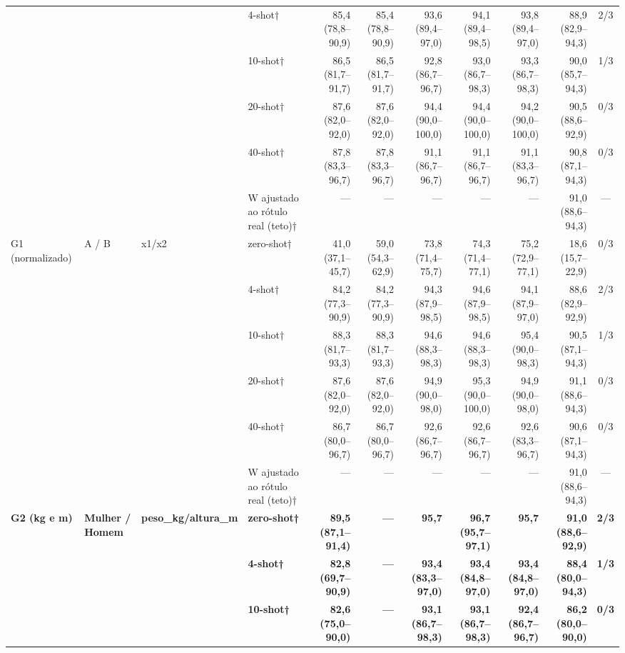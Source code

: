 \begin{table}[htbp]
\begin{tabular}{llllrrrrrrc}
 &  &  & 4-shot† & 85,4 (78,8–90,9) & 85,4 (78,8–90,9) & 93,6 (89,4–97,0) & 94,1 (89,4–98,5) & 93,8 (89,4–97,0) & 88,9 (82,9–94,3) & 2/3 \\
 &  &  & 10-shot† & 86,5 (81,7–91,7) & 86,5 (81,7–91,7) & 92,8 (86,7–96,7) & 93,0 (86,7–98,3) & 93,3 (86,7–98,3) & 90,0 (85,7–94,3) & 1/3 \\
 &  &  & 20-shot† & 87,6 (82,0–92,0) & 87,6 (82,0–92,0) & 94,4 (90,0–100,0) & 94,4 (90,0–100,0) & 94,2 (90,0–100,0) & 90,5 (88,6–92,9) & 0/3 \\
 &  &  & 40-shot† & 87,8 (83,3–96,7) & 87,8 (83,3–96,7) & 91,1 (86,7–96,7) & 91,1 (86,7–96,7) & 91,1 (83,3–96,7) & 90,8 (87,1–94,3) & 0/3 \\
 &  &  & W ajustado ao rótulo real (teto)† & — & — & — & — & — & 91,0 (88,6–94,3) & — \\
\midrule
G1 (normalizado) & A / B & x1/x2 & zero-shot† & 41,0 (37,1–45,7) & 59,0 (54,3–62,9) & 73,8 (71,4–75,7) & 74,3 (71,4–77,1) & 75,2 (72,9–77,1) & 18,6 (15,7–22,9) & 0/3 \\
 &  &  & 4-shot† & 84,2 (77,3–90,9) & 84,2 (77,3–90,9) & 94,3 (87,9–98,5) & 94,6 (87,9–98,5) & 94,1 (87,9–97,0) & 88,6 (82,9–92,9) & 2/3 \\
 &  &  & 10-shot† & 88,3 (81,7–93,3) & 88,3 (81,7–93,3) & 94,6 (88,3–98,3) & 94,6 (88,3–98,3) & 95,4 (90,0–98,3) & 90,5 (87,1–94,3) & 1/3 \\
 &  &  & 20-shot† & 87,6 (82,0–92,0) & 87,6 (82,0–92,0) & 94,9 (90,0–98,0) & 95,3 (90,0–100,0) & 94,9 (90,0–98,0) & 91,1 (88,6–94,3) & 0/3 \\
 &  &  & 40-shot† & 86,7 (80,0–96,7) & 86,7 (80,0–96,7) & 92,6 (86,7–96,7) & 92,6 (86,7–96,7) & 92,6 (83,3–96,7) & 90,6 (87,1–94,3) & 0/3 \\
 &  &  & W ajustado ao rótulo real (teto)† & — & — & — & — & — & 91,0 (88,6–94,3) & — \\
\midrule
\textbf{G2 (kg e m)} & \textbf{Mulher / Homem} & \textbf{peso\_kg/altura\_m} & \textbf{zero-shot†} & \textbf{89,5 (87,1–91,4)} & \textbf{—} & \textbf{95,7} & \textbf{96,7 (95,7–97,1)} & \textbf{95,7} & \textbf{91,0 (88,6–92,9)} & \textbf{2/3} \\
 &  &  & \textbf{4-shot†} & \textbf{82,8 (69,7–90,9)} & \textbf{—} & \textbf{93,4 (83,3–97,0)} & \textbf{93,4 (84,8–97,0)} & \textbf{93,4 (84,8–97,0)} & \textbf{88,4 (80,0–94,3)} & \textbf{1/3} \\
 &  &  & \textbf{10-shot†} & \textbf{82,6 (75,0–90,0)} & \textbf{—} & \textbf{93,1 (86,7–98,3)} & \textbf{93,1 (86,7–98,3)} & \textbf{92,4 (86,7–96,7)} & \textbf{86,2 (80,0–90,0)} & \textbf{0/3} \\

\end{tabular}
\end{table}

